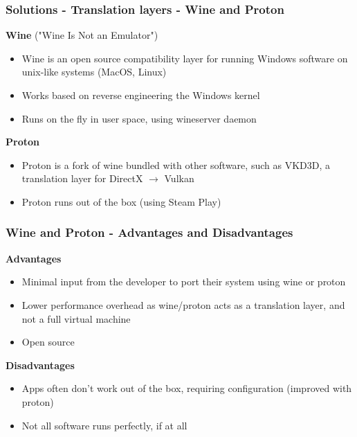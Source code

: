 
\begin{frame}
\frametitle{Solutions - Translation layers - Wine and Proton}
\begin{redbox}
\textbf{Wine} ("Wine Is Not an Emulator")
\vspace{5pt}
\begin{itemize}
    \setlength{\itemsep}{8pt}
    \item Wine is an open source compatibility layer for running Windows software on unix-like systems (MacOS, Linux)  \cite{wine_wikipedia}
    \item Works based on reverse engineering the Windows kernel \cite{wine_wikipedia}
    \item Runs on the fly in user space, using wineserver daemon \cite{wine_wikipedia}
\end{itemize}
\end{redbox}
\begin{yellowbox}
\textbf{Proton}
\vspace{5pt}
\begin{itemize}
    \setlength{\itemsep}{8pt}
    \item Proton is a fork of wine bundled with other software, such as VKD3D, a translation layer for DirectX $\rightarrow$ Vulkan \cite{proton_wikipedia}
    \item Proton runs out of the box (using Steam Play) \cite{steam}
\end{itemize}
\end{yellowbox}

\end{frame}

\begin{frame}
\frametitle{Wine and Proton - Advantages and Disadvantages}
\begin{theorembox}
\textbf{Advantages}
\begin{itemize}
    \item Minimal input from the developer to port their system using wine or proton
    \item Lower performance overhead as wine/proton acts as a translation layer, and not a full virtual machine
    \item Open source
\end{itemize}
\end{theorembox}
\begin{redbox}
\textbf{Disadvantages}
\begin{itemize}
    \item Apps often don't work out of the box, requiring configuration (improved with proton)
    \item Not all software runs perfectly, if at all
\end{itemize}
\end{redbox}
\end{frame}

